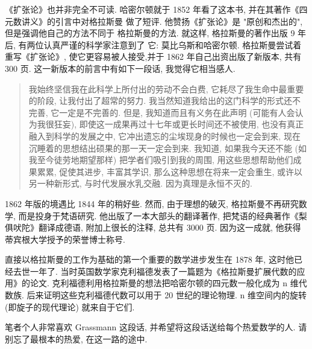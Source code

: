 \documentclass[UTF8]{book}
\begin{document}
《扩张论》也并非完全不可读. 
哈密尔顿就于 1852 年看了这本书, 并在其著作《四元数讲义》的引言中对格拉斯曼
做了短评. 他赞扬《扩张论》是 "原创和杰出的", 但是强调他自己的方法不同于
格拉斯曼的方法. 就这样, 格拉斯曼的著作出版 9 年后, 有两位认真严谨的科学家注意到了
它: 莫比乌斯和哈密尔顿. 
格拉斯曼尝试着重写《扩张论》, 使它更容易被人接受,并于 1862 年自己出资出版了新版本, 
共有 300 页. 这一新版本的前言中有如下一段话, 我觉得它相当感人. 


\begin{quotation}
    \textsf{
    我始终坚信我在此科学上所付出的劳动不会白费, 它耗尽了我生命中最重要的阶段, 
    让我付出了超常的努力. 我当然知道我给出的这门科学的形式还不完善, 
    它一定是不完善的. 但是, 我知道而且有义务在此声明 (可能有人会认为我很狂妄), 
    即使这一成果再过十七年或更长时间还不被使用, 也没有真正融入到科学的发展之中, 
    它冲出遗忘的尘埃现身的时候也一定会到来, 现在沉睡着的思想结出硕果的那一天一定会到来. 
    我知道, 如果我今天还不能 (如我至今徒劳地期望那样) 把学者们吸引到我的周围, 
    用这些思想帮助他们成果累累, 促使其进步, 丰富其学识, 
    那么这种思想在将来一定会重生, 或许以另一种新形式, 与时代发展水乳交融. 
    因为真理是永恒不灭的. 
    }
\end{quotation}

1862 年版的境遇比 1844 年的稍好些. 然而, 由于理想的破灭, 格拉斯曼不再研究数学, 
而是投身于梵语研究. 他出版了一本大部头的翻译著作, 把梵语的经典著作《梨俱吠陀》翻译成德语, 
附加上很长的注释, 总共有 3000 页. 因为这一成就, 
他获得蒂宾根大学授予的荣誉博士称号. 

直接以格拉斯曼的工作为基础的第一个重要的数学进步发生在 1878 年, 
这时他已经去世一年了. 
当时英国数学家克利福德发表了一篇题为《格拉斯曼扩展代数的应用》的论文. 
克利福德利用格拉斯曼的想法把哈密尔顿的四元数一般化成为 n 维代数族. 
后来证明这些克利福德代数可以用于 20 世纪的理论物理. 
n 维空间内的旋转 (即旋子的现代理论) 就来自于它们.

\vspace*{0.8cm}

\songti
笔者个人非常喜欢 Grassmann 这段话, 并希望将这段话送给每个热爱数学的人. 
请别忘了最根本的热爱, 在这一路的途中. 
\end{document}
